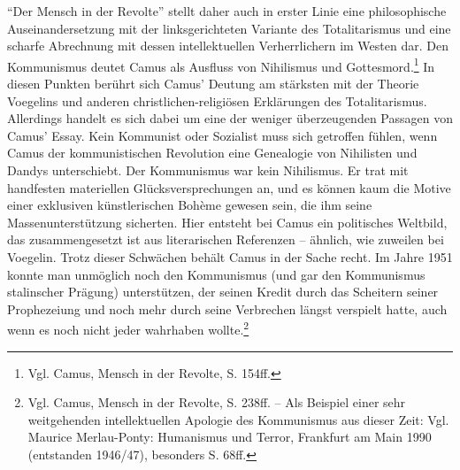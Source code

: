 "`Der Mensch in der Revolte"' stellt daher auch in erster Linie eine
philosophische Auseinandersetzung mit der linksgerichteten Variante des
Totalitarismus und eine scharfe Abrechnung mit dessen intellektuellen
Verherrlichern im Westen dar. Den Kommunismus deutet Camus als Ausfluss von
Nihilismus und Gottesmord.\footnote{Vgl. Camus, Mensch in der Revolte,
  S. 154ff.} In diesen Punkten berührt sich Camus' Deutung am stärksten mit der
Theorie Voegelins und anderen christlichen-religiösen Erklärungen des
Totalitarismus. Allerdings handelt es sich dabei um eine der weniger
überzeugenden Passagen von Camus' Essay. Kein Kommunist oder Sozialist muss
sich getroffen fühlen, wenn Camus der kommunistischen Revolution eine
Genealogie von Nihilisten und Dandys unterschiebt. Der Kommunismus war kein
Nihilismus. Er trat mit handfesten materiellen Glücksversprechungen an, und es
können kaum die Motive einer exklusiven künstlerischen Bohème gewesen sein,
die ihm seine Massenunterstützung sicherten. Hier entsteht bei Camus ein
politisches Weltbild, das zusammengesetzt ist aus literarischen Referenzen --
ähnlich, wie zuweilen bei Voegelin. Trotz dieser Schwächen behält Camus in der
Sache recht. Im Jahre 1951 konnte man unmöglich noch den Kommunismus (und gar
den Kommunismus stalinscher Prägung) unterstützen, der seinen Kredit durch das
Scheitern seiner Prophezeiung und noch mehr durch seine Verbrechen längst
verspielt hatte, auch wenn es noch nicht jeder wahrhaben wollte.\footnote{Vgl.
  Camus, Mensch in der Revolte, S. 238ff. -- Als Beispiel einer sehr
  weitgehenden intellektuellen Apologie des Kommunismus aus dieser Zeit: Vgl.
  Maurice Merlau-Ponty: Humanismus und Terror, Frankfurt am Main 1990
  (entstanden 1946/47), besonders S. 68ff.}

